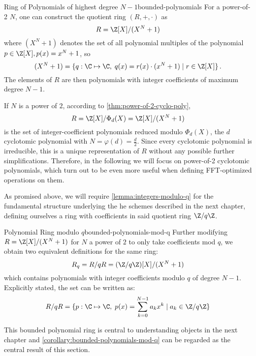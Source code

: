 \begin{definition}{Ring of Polynomials of highest degree $N-1$}{bounded-polynomials}
  For a power-of-2 $N$, one can construct the quotient ring $(R, +, \cdot)$ as
  $$R = \Z[X] / (X^N + 1)$$
  where $(X^N + 1)$ denotes the set of all polynomial multiples of the polynomial $p \in \Z[X], p(x) = x^N + 1$, so
  $$(X^N+1) = \{q: \C \mapsto \C,\; q(x) = r(x) \cdot (x^N+1) \;|\; r \in \Z[X]\} \,.$$
  The elements of $R$ are then polynomials with integer coefficients of maximum degree $N-1$.
\end{definition}

If $N$ is a power of $2$, according to \cref{thm:power-of-2-cyclo-poly}, $$R = \Z[X] / \Phi_d(X) = \Z[X] / (X^N + 1)$$ is the set of integer-coefficient polynomials reduced modulo $\Phi_d(X)$, the $d$\th cyclotomic polynomial with $N = \varphi(d) = \frac{d}{2}$.
Since every cyclotomic polynomial is irreducible, this is a unique representation of $R$ without any possible further simplifications.
Therefore, in the following we will focus on power-of-2 cyclotomic polynomials, which turn out to be even more useful when defining FFT-optimized operations on them.

As promised above, we will require \cref{lemma:integers-modulo-q} for the fundamental structure underlying the \gls{he} schemes described in the next chapter, defining ourselves a ring with coefficients in said quotient ring $\Z/q\Z$.

\begin{corollary}{Polynomial Ring modulo $q$}{bounded-polynomials-mod-q}
  Further modifying $R = \Z[X] / (X^N+1)$ for $N$ a power of $2$ to only take coefficients mod $q$, we obtain two equivalent definitions for the same ring:
  $$R_q = R/qR = (\Z/q\Z)[X] / (X^N+1)$$
  which contains polynomials with integer coefficients modulo $q$ of degree $N-1$.
  Explicitly stated, the set can be written as:
  $$R/qR = \{p: \C \mapsto \C,\; p(x) = \sum_{k=0}^{N-1} a_k x^k \;|\; a_k \in \Z/q\Z\}$$
\end{corollary}

This bounded polynomial ring is central to understanding objects in the next chapter and \cref{corollary:bounded-polynomials-mod-q} can be regarded as the central result of this section.

\pagebreak
